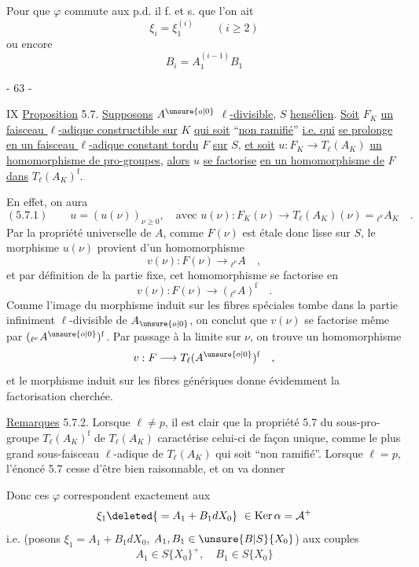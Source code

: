 Pour que $\varphi$ commute aux p.d. il f. et s.
que l'on ait
\[
\xi_i=\xi_1^{(i)}\qquad(i\geq2)
\]
ou encore
\[
B_i=A_1^{(i-1)}B_1
\]
\begin{center}- 63 -\end{center}
\hfill IX
\uline{Proposition} 5.7. \uline{Supposons} $A^{\unsure{o|0}}$ \uline{$\ell$-divisible}, $S$ \uline{hensélien}. \uline{Soit} $F_K$ \uline{un}
\uline{faisceau $\ell$-adique constructible sur} $K$ \uline{qui soit} ``\uline{non ramifié}'' \uline{i.e. qui}
\uline{se prolonge en un faisceau $\ell$-adique constant tordu} $F$ \uline{sur} $S$, \uline{et soit}
$u:F_K\longrightarrow T_\ell(A_K)$ \uline{un homomorphisme de pro-groupes}, \uline{alors} $u$ \uline{se factorise}
\uline{en un homomorphisme de} $F$ \uline{dans} $T_\ell(A_K)^{\mathrm f}$.

En effet, on aura
\[
(5.7.1)\qquad u=(u(\nu))_{\nu\geq0},\quad\text{avec }u(\nu):F_K(\nu)\longrightarrow T_\ell(A_K)(\nu)={}_{\ell^\nu}A_K\quad .
\]
Par la propriété universelle de $A$, comme $F(\nu)$ est étale donc lisse sur
$S$, le morphisme $u(\nu)$ provient d'un homomorphisme
\[
v(\nu):F(\nu)\longrightarrow{}_{\ell^\nu}A\quad ,
\]
et par définition de la partie fixe, cet homomorphisme se factorise en
\[
v(\nu):F(\nu)\longrightarrow({}_{\ell^\nu}A)^{\mathrm f}\quad .
\]
Comme l'image du morphisme induit sur les fibres spéciales tombe dans
la partie infiniment $\ell$-divisible de $A_{\unsure{o|0}}$, on conclut que $v(\nu)$ se factorise
même par $({}_{\ell^\nu}A^{\unsure{o|0}})^{\mathrm f}$. Par passage à la limite sur $\nu$, on trouve un homomorphisme
\[
v:F\longrightarrow T_\ell(A^{\unsure{o|0}})^{\mathrm f}\quad ,
\]
et le morphisme induit sur les fibres génériques donne évidemment la
factorisation cherchée.

\uline{Remarques} 5.7.2. Lorsque $\ell\ne p$, il est clair que la propriété 5.7 du
sous-pro-groupe $T_\ell(A_K)^{\mathrm f}$ de $T_\ell(A_K)$ caractérise celui-ci de façon unique,
comme le plus grand sous-faisceau $\ell$-adique de $T_\ell(A_K)$ qui soit ``non ramifié''.
Lorsque $\ell=p$, l'énoncé 5.7 cesse d'être bien raisonnable, et on va donner

Donc ces $\varphi$ correspondent exactement aux
\[
\xi_1\deleted{{}=A_1+B_1dX_0}\ \in\operatorname{Ker}\alpha=\mathcal A^+
\]
i.e.  (posons $\xi_1=A_1+B_1dX_0$, $A_1,B_1\in\unsure{B|S}\{X_0\}$)
aux couples
\[
A_1\in S\{X_0\}^{+},\quad B_1\in S\{X_0\}
\]


